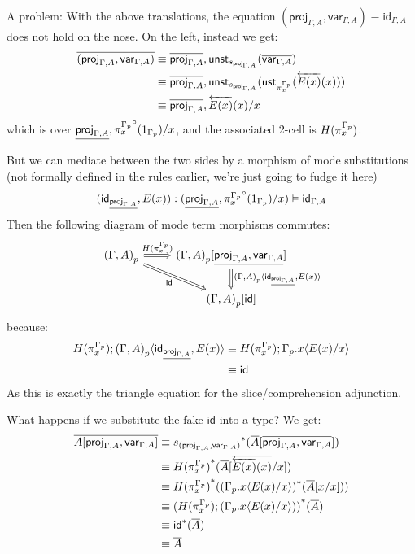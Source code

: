 \documentclass[10pt]{article}
\theoremstyle{definition}
\newcommand{\rewrite}[2]{\overleftarrow{#1}(#2)}
\newcommand\St[2]{\ensuremath{{#1}^*(#2)}}
\newcommand\UStI[2]{\ensuremath{\mathsf{ust}_{#1}(#2)}}
\newcommand\UnSt[2]{\ensuremath{\mathsf{unst}_{#1}(#2)}}
\newcommand\TrCirc[2]{\ensuremath{{#1}^\circ(#2)}}
\newcommand\proj[1]{\ensuremath{\mathsf{proj}_{#1}}}
\newcommand\var[1]{\ensuremath{\mathsf{var}_{#1}}}
\newcommand{\id}{\mathsf{id}}
\newcommand\ap[2]{\ensuremath{#1 \langle #2 \rangle }}
\begin{document}
A problem: With the above translations, the equation $(\proj{\Gamma,A}, \var{\Gamma,A}) \equiv \id_{\Gamma, A}$ does not hold on the nose. On the left, instead we get:
\begin{align*}
\upstairs{(\proj{\Gamma,A}, \var{\Gamma,A})}
&\equiv \upstairs{\proj{\Gamma, A}} , \UnSt{s_{\proj{\Gamma, A}}}{\upstairs{\var{\Gamma, A}}} \\
&\equiv \upstairs{\proj{\Gamma, A}} , \UnSt{s_{\proj{\Gamma, A}}}{\UStI{\pi^{\asdep{\Gamma}}_x}{\rewrite{E(x)}{x}}} \\
&\equiv \upstairs{\proj{\Gamma, A}} , \rewrite{E(x)}{x} / x
\end{align*}
which is over $\downstairs{\proj{\Gamma, A}} , \TrCirc{\pi^{\asdep{\Gamma}}_x}{1_{\asdep{\Gamma}}} / x$, and the associated 2-cell is $H(\pi^{{\Gamma}_p}_x)$.

But we can mediate between the two sides by a morphism of mode substitutions (not formally defined in the rules earlier, we're just going to fudge it here)
 \[(\id_{\downstairs{\proj{\Gamma, A}} }, E(x))  : (\downstairs{\proj{\Gamma, A}} , \TrCirc{\pi^{\asdep{\Gamma}}_x}{1_{\asdep{\Gamma}}} / x) \vDash \id_{\Gamma, A}\]
Then the following diagram of mode term morphisms commutes:
\[\begin{tikzcd}
\asdep{(\Gamma, A)} \ar[r, Rightarrow, "H(\pi^{\asdep{\Gamma}}_x)"] \ar[dr, Rightarrow, "\id" swap] & \asdep{(\Gamma, A)}[\downstairs{\proj{\Gamma,A}, \var{\Gamma,A}}] \ar[d, Rightarrow, "{\ap{\asdep{(\Gamma, A)}}{\id_{\downstairs{\proj{\Gamma, A}} }, E(x)}}"]\\
& \asdep{(\Gamma, A)}[\id]
\end{tikzcd}\]
because:
\begin{align*}
H(\pi^{\asdep{\Gamma}}_x) ; {\ap{\asdep{(\Gamma, A)}}{\id_{\downstairs{\proj{\Gamma, A}} }, E(x)}}
&\equiv H(\pi^{\asdep{\Gamma}}_x) ; {\ap{\asdep{\Gamma}.x}{E(x)/x}} \\
&\equiv \id
\end{align*}
As this is exactly the triangle equation for the slice/comprehension adjunction.

What happens if we substitute the fake $\id$ into a type? We get:
\begin{align*}
\upstairs{A[\proj{\Gamma,A}, \var{\Gamma,A}]}
&\equiv \St{s_{(\proj{\Gamma,A}, \var{\Gamma,A})}}{\upstairs{A}[ \upstairs{\proj{\Gamma,A}, \var{\Gamma,A}}]} \\
&\equiv \St{H(\pi^{\asdep{\Gamma}}_x)}{\upstairs{A}[ \upstairs{\rewrite{E(x)}{x}} / x]} \\
&\equiv \St{H(\pi^{\asdep{\Gamma}}_x)}{\St{(\ap{\asdep{\Gamma}.x}{E(x)/x})}{\upstairs{A}[ x / x]}}\\
&\equiv \St{(H(\pi^{\asdep{\Gamma}}_x);(\ap{\asdep{\Gamma}.x}{E(x)/x}))}{\upstairs{A}} \\
&\equiv \St{\id}{\upstairs{A}} \\
&\equiv \upstairs{A}
\end{align*}
\end{document}
